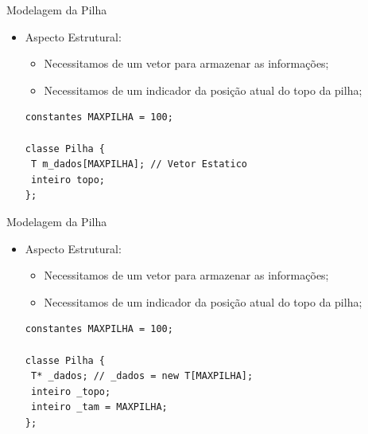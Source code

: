 \documentclass[12pt,table,xcolor={dvipsnames}]{beamer}
\begin{document}
\begin{frame}[fragile]{Modelagem da Pilha}

\begin{itemize}
\item Aspecto Estrutural:
\begin{itemize}
\item Necessitamos de um vetor para armazenar as informações;
\item Necessitamos de um indicador da posição atual do topo da pilha;
\end{itemize}
\begin{lstlisting}
constantes MAXPILHA = 100;

classe Pilha {
 T m_dados[MAXPILHA]; // Vetor Estatico
 inteiro topo;        
};
\end{lstlisting}
\end{itemize}
\end{frame}

\begin{frame}[fragile]{Modelagem da Pilha}

\begin{itemize}
\item Aspecto Estrutural:
\begin{itemize}
\item Necessitamos de um vetor para armazenar as informações;
\item Necessitamos de um indicador da posição atual do topo da pilha;
\end{itemize}
\begin{lstlisting}
constantes MAXPILHA = 100;

classe Pilha {
 T* _dados; // _dados = new T[MAXPILHA];
 inteiro _topo;
 inteiro _tam = MAXPILHA;        
};
\end{lstlisting}
\end{itemize}
\end{frame}
\end{document}
